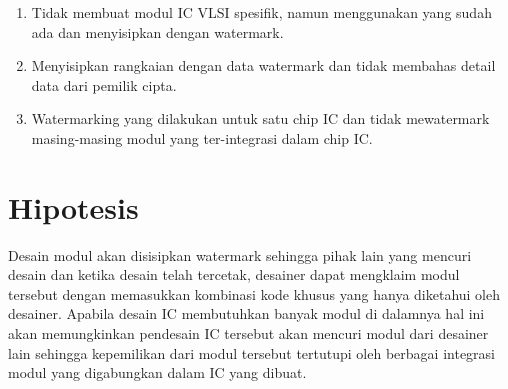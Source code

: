 \begin{enumerate}
	\item Tidak membuat modul IC VLSI spesifik, namun menggunakan yang sudah ada dan menyisipkan dengan watermark.
	
	\item Menyisipkan rangkaian dengan data watermark dan tidak membahas detail data dari pemilik cipta.
	
	\item Watermarking yang dilakukan untuk satu chip IC dan tidak mewatermark masing-masing modul yang ter-integrasi dalam chip IC. 
\end{enumerate}

\section{Hipotesis}
Desain modul akan disisipkan watermark sehingga pihak lain yang mencuri desain dan ketika desain telah tercetak, desainer dapat mengklaim modul tersebut dengan memasukkan kombinasi kode khusus yang hanya diketahui oleh desainer. Apabila desain IC membutuhkan banyak modul di dalamnya hal ini akan memungkinkan pendesain IC tersebut akan mencuri modul dari desainer lain sehingga kepemilikan dari modul tersebut tertutupi oleh berbagai integrasi modul yang digabungkan dalam IC yang dibuat.


